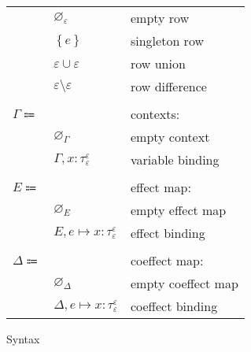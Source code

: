 \documentclass[12pt]{article}
\newcommand\anno[2]{#1 : #2}
\newcommand\evar{x}
\newcommand\tembellished[3]{{#1}^{#2}_{#3}}
\newcommand\proper{\tau}
\newcommand\row{\varepsilon}
\newcommand\rempty{\varnothing_{\row}}
\newcommand\rsingleton[1]{\left\{ #1 \right\}}
\newcommand\runion[2]{#1 \cup #2}
\newcommand\rdiff[2]{#1 \setminus #2}
\newcommand\context{\Gamma}
\newcommand\cempty{\varnothing_{\context}}
\newcommand\cextend[2]{#1, #2}
\newcommand\effect{e}
\newcommand\effectmap{E}
\newcommand\coeffectmap{\Delta}
\newcommand\emempty{\varnothing_{\effectmap}}
\newcommand\ecomempty{\varnothing_{\coeffectmap}}
\newcommand\emmap[2]{#1 \mapsto #2}
\newcommand\emextend[2]{#1, #2}
\begin{document}
\begin{figure}[H]
\begin{mdframed}[backgroundcolor=none]
\begin{center}
\begin{tabular}{l l l}
              & $\rempty$ & empty row \\
              & $\rsingleton{\effect}$ & singleton row \\
              & $\runion{\row}{\row}$ & row union \\
              & $\rdiff{\row}{\row}$ & row difference \\
              \\
              $\context \Coloneqq$ & & contexts: \\
              & $\cempty$ & empty context \\
              & $\cextend{\context}{\anno{\evar}{\tembellished{\proper}{\row}{\row}}}$ & variable binding \\
              \\
              $\effectmap \Coloneqq$ & & effect map: \\
              & $\emempty$ & empty effect map \\
              & $\emextend{\effectmap}{\emmap{\effect}{\anno{\evar}{\tembellished{\proper}{\row}{\row}}}}$ & effect binding \\
              \\
              $\coeffectmap \Coloneqq$ & & coeffect map: \\
              & $\ecomempty$ & empty coeffect map \\
              & $\emextend{\coeffectmap}{\emmap{\effect}{\anno{\evar}{\tembellished{\proper}{\row}{\row}}}}$ & coeffect binding \\
            \end{tabular}
          \end{center}

          \caption{Syntax}\label{fig:syntax}
        \end{mdframed}
      \end{figure}
\end{document}
